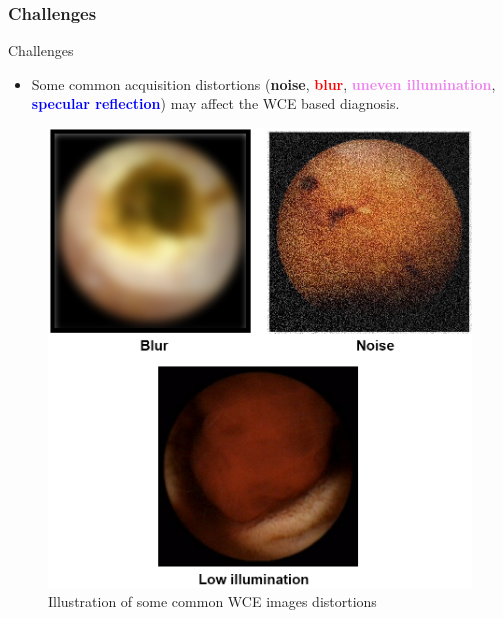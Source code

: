 \documentclass{libs/ufc_format}
\begin{document}
\subsubsection{Challenges}
\begin{frame}{Challenges}
    \begin{itemize}
        \item Some common acquisition distortions (\textbf{noise}, \textcolor{red}{\textbf{blur}}, \textcolor{violet}{\textbf{uneven illumination}}, \textcolor{blue}{\textbf{specular reflection}}) may affect the WCE based diagnosis.
    \end{itemize}


    \begin{figure}
        \centering
        \includegraphics[scale=0.15]{libs/wcedistortions.png}
        \vspace{0.4cm}
        \caption{Illustration of some common WCE images distortions}
        \label{fig:endoscopy}
    \end{figure}

\end{frame}
\end{document}
